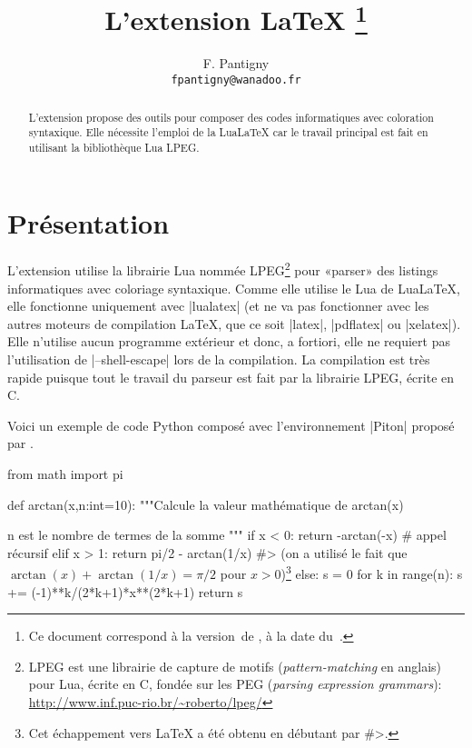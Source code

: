 \documentclass[dvipsnames,svgnames]{article}
\begin{document}


\title{L'extension LaTeX \thanks{Ce document correspond à la 
version~\PitonFileVersion\space de , à la date du~\PitonFileDate.}} 
\author{F. Pantigny \\ \texttt{fpantigny@wanadoo.fr}}

\maketitle

\begin{abstract}
L'extension  propose des outils pour composer des codes informatiques avec
coloration syntaxique. Elle nécessite l'emploi de la LuaLaTeX car le travail principal est
fait en utilisant la bibliothèque Lua LPEG.
\end{abstract}


\section{Présentation}



L'extension  utilise la librairie Lua nommée LPEG\footnote{LPEG est
  une librairie de capture de motifs (\emph{pattern-matching} en anglais) pour
  Lua, écrite en C, fondée sur les PEG (\emph{parsing expression grammars}):
  \url{http://www.inf.puc-rio.br/~roberto/lpeg/}} pour «parser» des listings
informatiques avec coloriage syntaxique. Comme elle utilise le Lua de LuaLaTeX,
elle fonctionne uniquement avec |lualatex| (et ne va pas fonctionner avec les
autres moteurs de compilation LaTeX, que ce soit |latex|, |pdflatex| ou
|xelatex|). Elle n'utilise aucun programme extérieur et donc, a fortiori, elle
ne requiert pas l'utilisation de |--shell-escape| lors de la compilation. La
compilation est très rapide puisque tout le travail du parseur est fait par la
librairie LPEG, écrite en C.

\medskip
Voici un exemple de code Python composé avec l'environnement |{Piton}|
proposé par .


\medskip
\begin{Piton}
from math import pi

def arctan(x,n:int=10):
    """Calcule la valeur mathématique de arctan(x)

    n est le nombre de termes de la somme
    """
    if x < 0:
        return -arctan(-x) # appel récursif
    elif x > 1: 
        return pi/2 - arctan(1/x) 
        #> (on a utilisé le fait que $\arctan(x)+\arctan(1/x)=\pi/2$ pour $x>0$)\footnote{Cet échappement vers LaTeX a été obtenu en débutant par \ttfamily\#>.} 
    else: 
        s = 0
        for k in range(n):
            s += (-1)**k/(2*k+1)*x**(2*k+1)
        return s
\end{Piton}
\end{document}

